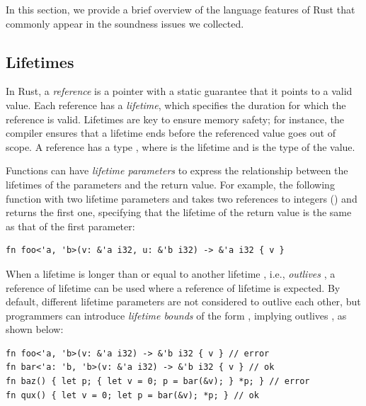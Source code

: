 In this section, we provide a brief overview of the language features of Rust
that commonly appear in the soundness issues we collected.

\subsection{Lifetimes}
\label{sec:background:lifetime}

In Rust, a \emph{reference} is a pointer with a static guarantee that it points
to a valid value.
%
Each reference has a \emph{lifetime}, which specifies the duration for which the
reference is valid.
%
Lifetimes are key to ensure memory safety;
%
for instance, the compiler ensures that a lifetime ends before the referenced
value goes out of scope.
%
A reference has a type , where  is the lifetime and  is the
type of the value.

Functions can have \emph{lifetime parameters} to express the relationship
between the lifetimes of the parameters and the return value.
%
For example, the following function with two lifetime parameters  and
 takes two references to integers () and returns the first one,
specifying that the lifetime of the return value is the same as that of the
first parameter:

\vspace{-0.5em}
\begin{lstlisting}[basicstyle=\linespread{0.85}\ttfamily\footnotesize,]
fn foo<'a, 'b>(v: &'a i32, u: &'b i32) -> &'a i32 { v }
\end{lstlisting}
\vspace{-0.5em}

When a lifetime  is longer than or equal to another lifetime , i.e.,
 \emph{outlives} , a reference of lifetime  can be used where
a reference of lifetime  is expected.
%
By default, different lifetime parameters are not considered to outlive each
other, but programmers can introduce \emph{lifetime bounds} of the form , implying  outlives , as shown below:

\vspace{-0.5em}
\begin{lstlisting}[basicstyle=\linespread{0.85}\ttfamily\footnotesize,]
fn foo<'a, 'b>(v: &'a i32) -> &'b i32 { v } // error
fn bar<'a: 'b, 'b>(v: &'a i32) -> &'b i32 { v } // ok
fn baz() { let p; { let v = 0; p = bar(&v); } *p; } // error
fn qux() { let v = 0; let p = bar(&v); *p; } // ok
\end{lstlisting}
\vspace{-0.5em}

